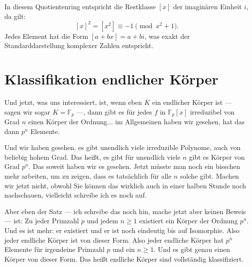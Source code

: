 \begin{math-stroke}

\begin{explanation-of-steps}
In diesem Quotientenring entspricht die Restklasse $[x]$ der imaginären Einheit $i$, da gilt:
\[
[x]^2 = [x^2] \equiv -1 \pmod{x^2 + 1}.
\]
Jedes Element hat die Form $[a + bx] = a + bi$, was exakt der Standarddarstellung komplexer Zahlen entspricht.
\end{explanation-of-steps}
\end{math-stroke}

\section{Klassifikation endlicher Körper}

\begin{spoken-clean}[01:00:21 - 01:02:09]
Und jetzt, was uns interessiert, ist, wenn eben $K$ ein endlicher Körper ist --- sagen wir sogar $K = \mathbb{F}_p$ ---, dann gibt es für jedes $f$ in $\mathbb{F}_p[x]$ irreduzibel von Grad $n$ einen Körper der Ordnung... im Allgemeinen haben wir gesehen, hat das dann $p^n$ Elemente. 

Und wir haben gesehen, es gibt unendlich viele irreduzible Polynome, auch von beliebig hohem Grad. Das heißt, es gibt für unendlich viele $n$ gibt es Körper von Grad $p^n$. Das soweit haben wir es gesehen. Jetzt müsste man noch ein bisschen mehr arbeiten, um zu zeigen, dass es tatsächlich für alle $n$ solche gibt. Machen wir jetzt nicht, obwohl Sie können das wirklich auch in einer halben Stunde noch nachschauen, vielleicht schreibe ich es noch auf. 

Aber eben der Satz --- ich schreibe das noch hin, mache jetzt aber keinen Beweis --- ist: Zu jeder Primzahl $p$ und jedem $n \ge 1$ existiert ein Körper der Ordnung $p^n$. Und es ist mehr: er existiert und er ist noch eindeutig bis auf Isomorphie. Also jeder endliche Körper ist von dieser Form. Also jeder endliche Körper hat $p^n$ Elemente für irgendeine Primzahl $p$ und ein $n \ge 1$. Und es gibt genau einen Körper von dieser Form. Das heißt endliche Körper sind vollständig klassifiziert.
\end{spoken-clean}

